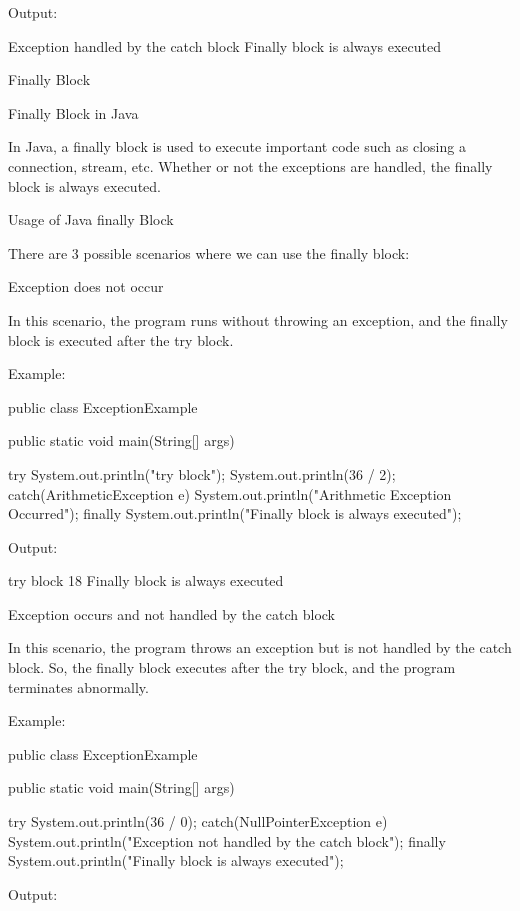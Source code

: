 {Output:
 

Exception handled by the catch block
Finally block is always executed


Finally Block
 

 

Finally Block in Java
 

In Java, a finally block is used to execute important code such as closing a connection, stream, etc. Whether or not the exceptions are handled, the finally block is always executed.


Usage of Java finally Block
 

There are 3 possible scenarios where we can use the finally block:

 

Exception does not occur
 

In this scenario, the program runs without throwing an exception, and the finally block is executed after the try block.

 

Example:
 

public class ExceptionExample {

	public static void main(String[] args) {
		
		try {
			System.out.println("try block");
			System.out.println(36 / 2);
		}
		catch(ArithmeticException e) {
			System.out.println("Arithmetic Exception Occurred");
		}
		finally {
			System.out.println("Finally block is always executed");
		}
	}
}
 

Output:
 

try block
18
Finally block is always executed
 

 

Exception occurs and not handled by the catch block
 

In this scenario, the program throws an exception but is not handled by the catch block. So, the finally block executes after the try block, and the program terminates abnormally.

 

Example:
 

public class ExceptionExample {

	public static void main(String[] args) {
		
		try {
			System.out.println(36 / 0);
		}
		catch(NullPointerException e) {
			System.out.println("Exception not handled by the catch block");
		}
		finally {
			System.out.println("Finally block is always executed");
		}
	}
}
 

Output:
 

}
